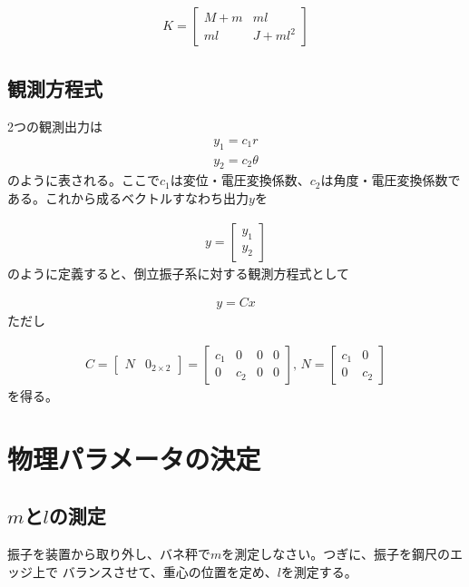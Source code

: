 \documentclass[a4j,11pt,twoside]{ujbook}
\begin{document}
			\begin{eqnarray*}
				K = \left[
				\begin{array}{cc}
					M+m & ml \\
					ml & J+ml^2
				\end{array}
				\right]
			\end{eqnarray*}

	\subsection{観測方程式}
	2つの観測出力は
	\begin{eqnarray*}
		y_1 = c_1r\\
		y_2 = c_2\theta
	\end{eqnarray*}
	のように表される。ここで$c_1$は変位・電圧変換係数、$c_2$は角度・電圧変換係数である。これから成るベクトルすなわち出力$y$を

	\begin{eqnarray*}
		y = \left[
		\begin{array}{c}
			y_1\\
			y_2
		\end{array}
		\right]
	\end{eqnarray*}
	のように定義すると、倒立振子系に対する観測方程式として

	\begin{eqnarray*}
		y = Cx
	\end{eqnarray*}
	ただし

	\begin{eqnarray}
		C 
		= 
		\left[
			\begin{array}{cc}
				N & 0_{2×2}
			\end{array}
		\right] 
		=
		\left[
			\begin{array}{cccc}
				c_1 &  0  & 0 & 0\\
				0  & c_2 & 0 & 0
			\end{array}
		\right],\,
		N 
		=
		\left[
			\begin{array}{cc}
				c_1 &  0 \\
				0  & c_2
			\end{array}
		\right]
		\label{eq:C,N}
	\end{eqnarray}
	を得る。

\section{物理パラメータの決定}
	\subsection{$m$と$l$の測定}
	振子を装置から取り外し、バネ秤で$m$を測定しなさい。つぎに、振子を鋼尺のエッジ上で
	バランスさせて、重心の位置を定め、$l$を測定する。
\end{document}
